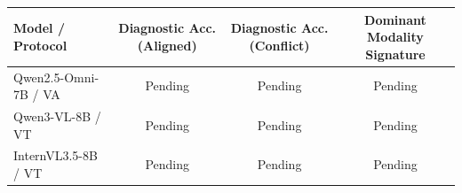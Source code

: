 \begin{tabular}{lccc}
\toprule
Model / Protocol & Diagnostic Acc. (Aligned) & Diagnostic Acc. (Conflict) & Dominant Modality Signature \\
\midrule
Qwen2.5-Omni-7B / VA & Pending & Pending & Pending \\
Qwen3-VL-8B / VT & Pending & Pending & Pending \\
InternVL3.5-8B / VT & Pending & Pending & Pending \\
\bottomrule
\end{tabular}
